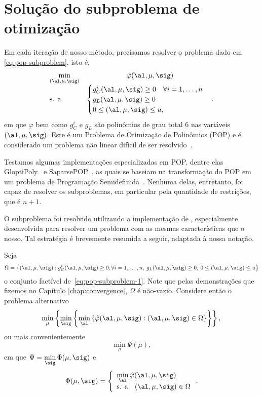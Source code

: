 \section{Solução do subproblema de otimização}

Em cada iteração de nosso método, precisamos resolver o problema dado em \eqref{eq:pop-subproblem}, isto é, 
\begin{equation}
	\label{eq:pop-subproblem-1}
	\begin{array}{lc}
\displaystyle \min_{(\al,\mu,\sig)} & \hat\varphi(\al,\mu,\sig) \\
\text{s. a.} &\begin{cases} g_C^i(\al,\mu,\sig) \geq 0 \quad \forall i = 1,\ldots,n \\
				g_L(\al,\mu,\sig)   \geq 0 	\\
				 0\leq (\al,\mu,\sig) \leq u,
				 	
				 \end{cases}.
\end{array}
\end{equation}
em que $\varphi$ bem como $g_{C}^{i}$ e $g_{L}$ são polinômios de grau total 6 nas variáveis $(\al,\mu,\sig)$. Este é um  Problema de Otimização de Polinômios (POP) e é considerado um problema não linear  difícil de ser resolvido~\cite{Laurent:2010kp}.

Testamos algumas  implementações especializadas em POP, dentre elas GloptiPoly~\cite{Henrion:2009eb} e SaparsePOP~\cite{Waki:2008ie}, as quais se baseiam na transformação do POP em um problema de Programação Semidefinida~\cite{Lasserre:2001fw}. Nenhuma delas, entretanto, foi capaz de resolver os subproblemas, em particular pela quantidade de restrições, que é  $n+1$.  


O subproblema foi resolvido utilizando a implementação de \textcite{VillasBoas:2012ur,VillasBoas2013:wn}, especialmente desenvolvida para resolver um problema com as mesmas características que o nosso.  Tal estratégia é brevemente resumida a seguir, adaptada à nossa notação.

Seja
\[\Omega = \left\{(\al,\mu,\sig): g_C^i(\al,\mu,\sig) \geq0, \forall i = 1,\ldots,n,\: g_L(\al,\mu,\sig)   \geq 0,\:		 0\leq (\al,\mu,\sig) \leq u\right\}\]
o conjunto factível de~\eqref{eq:pop-subproblem-1}. Note que pelas demonstrações que fizemos no Capítulo \ref{chap:convergence}, $\Omega$ é não-vazio. Considere então o problema alternativo
\begin{equation}
		\label{eq:pop-subproblem-2}
\displaystyle  \min_{\mu}\left\{  \min_{\sig} \left\{ \min_{\al} \left\{ \nextphi(\al,\mu,\sig):    (\al,\mu,\sig) \in \Omega  \right\} \right\}\right\}, \\
\end{equation}
ou mais convenientemente 
\[
\displaystyle \min_{\mu}\Psi(\mu),
\]
em que  $\displaystyle \Psi = \min_{\sig}\Phi(\mu,\sig)$ e 
\[
\Phi(\mu,\sig) = \left\{
	\begin{array}{l}
\displaystyle \min_{\al}  \nextphi(\al,\mu,\sig) \\
\text{s. a. }\:  (\al,\mu,\sig) \in\Omega
\end{array}\right..
\]
  
